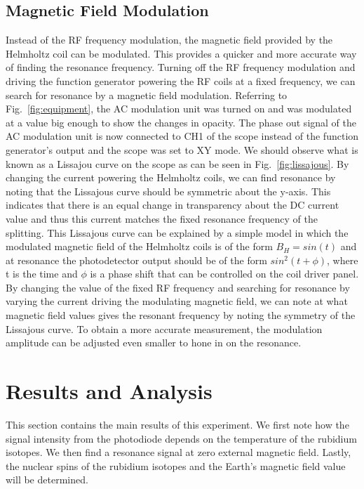 \documentclass[%
 aip,
rsi,%
 amsmath,amssymb,
 reprint,%
author-numerical,%
]{revtex4-1}
\begin{document}
\subsection{Magnetic Field Modulation}
Instead of the RF frequency modulation, the magnetic field provided by the Helmholtz coil can be modulated. This provides a quicker and more accurate way of finding the resonance frequency. Turning off the RF frequency modulation and driving the function generator powering the RF coils at a fixed frequency, we can search for resonance by a magnetic field modulation. Referring to Fig.~\ref{fig:equipment}, the AC modulation unit was turned on and was modulated at a value big enough to show the changes in opacity. \newline
\indent The phase out signal of the AC modulation unit is now connected to CH1 of the scope instead of the function generator's output and the scope was set to XY mode. We should observe what is known as a Lissajou curve on the scope as can be seen in Fig.~\ref{fig:lissajous}. \newline
\indent By changing the current powering the Helmholtz coils, we can find resonance by noting that the Lissajous curve should be symmetric about the y-axis. This indicates that there is an equal change in transparency about the DC current value and thus this current matches the fixed resonance frequency of the splitting. \newline
\indent This Lissajous curve can be explained by a simple model in which the modulated magnetic field of the Helmholtz coils is of the form $B _ { H }=sin(t)$ and at resonance the photodetector output should be of the form $sin^2(t+\phi)$, where t is the time and $\phi$ is a phase shift that can be controlled on the coil driver panel. \newline
\indent By changing the value of the fixed RF frequency and searching for resonance by varying the current driving the modulating magnetic field, we can note at what magnetic field values gives the resonant frequency by noting the symmetry of the Lissajous curve. To obtain a more accurate measurement, the modulation amplitude can be adjusted even smaller to hone in on the resonance.


\section{Results and Analysis} \label{5}
This section contains the main results of this experiment. We first note how the signal intensity from the photodiode depends on the temperature of the rubidium isotopes. We then find a resonance signal at zero external magnetic field. Lastly, the nuclear spins of the rubidium isotopes and the Earth's magnetic field value will be determined.
\end{document}
